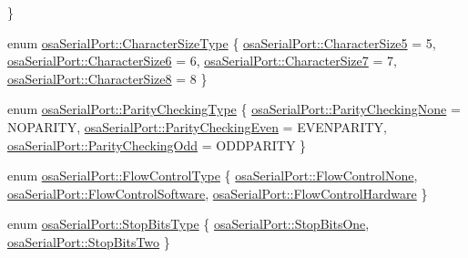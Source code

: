 \begin{DoxyCompactItemize}
 \}
\item 
enum \hyperlink{group__cisst_o_s_abstraction_ga9b6b558d8e4327ca921d9c010bec0462}{osa\+Serial\+Port\+::\+Character\+Size\+Type} \{ \hyperlink{group__cisst_o_s_abstraction_gga9b6b558d8e4327ca921d9c010bec0462a71a6f08cc8e95db9bb628a9e0f002376}{osa\+Serial\+Port\+::\+Character\+Size5} = 5, 
\hyperlink{group__cisst_o_s_abstraction_gga9b6b558d8e4327ca921d9c010bec0462a11e05646fa70b36bef65d1895974e4ca}{osa\+Serial\+Port\+::\+Character\+Size6} = 6, 
\hyperlink{group__cisst_o_s_abstraction_gga9b6b558d8e4327ca921d9c010bec0462a454d92a27af4c9f96b0c6c729e67b1ef}{osa\+Serial\+Port\+::\+Character\+Size7} = 7, 
\hyperlink{group__cisst_o_s_abstraction_gga9b6b558d8e4327ca921d9c010bec0462af6b6d68d0c71004693b62d55aed02837}{osa\+Serial\+Port\+::\+Character\+Size8} = 8
 \}
\item 
enum \hyperlink{group__cisst_o_s_abstraction_ga5a7547284e891eed488992c6a7204bfa}{osa\+Serial\+Port\+::\+Parity\+Checking\+Type} \{ \hyperlink{group__cisst_o_s_abstraction_gga5a7547284e891eed488992c6a7204bfaabbada773c8b505fc5733796acadee102}{osa\+Serial\+Port\+::\+Parity\+Checking\+None} = N\+O\+P\+A\+R\+I\+T\+Y, 
\hyperlink{group__cisst_o_s_abstraction_gga5a7547284e891eed488992c6a7204bfaa9abab4a570a32561ff68a7546f377bc2}{osa\+Serial\+Port\+::\+Parity\+Checking\+Even} = E\+V\+E\+N\+P\+A\+R\+I\+T\+Y, 
\hyperlink{group__cisst_o_s_abstraction_gga5a7547284e891eed488992c6a7204bfaa883d489757f267bca2a668245fc46a6d}{osa\+Serial\+Port\+::\+Parity\+Checking\+Odd} = O\+D\+D\+P\+A\+R\+I\+T\+Y
 \}
\item 
enum \hyperlink{group__cisst_o_s_abstraction_ga006138c4626520d3c2c1e5a78b279435}{osa\+Serial\+Port\+::\+Flow\+Control\+Type} \{ \hyperlink{group__cisst_o_s_abstraction_gga006138c4626520d3c2c1e5a78b279435a4196a7b3cbc15cf4f190ddc0e19a9254}{osa\+Serial\+Port\+::\+Flow\+Control\+None}, 
\hyperlink{group__cisst_o_s_abstraction_gga006138c4626520d3c2c1e5a78b279435a2ee117d5ab31cf26e91fc92c5af4e3f7}{osa\+Serial\+Port\+::\+Flow\+Control\+Software}, 
\hyperlink{group__cisst_o_s_abstraction_gga006138c4626520d3c2c1e5a78b279435a5c4075ee50d41c475a51232e382333f3}{osa\+Serial\+Port\+::\+Flow\+Control\+Hardware}
 \}
\item 
enum \hyperlink{group__cisst_o_s_abstraction_gaaa561ff95e10634b7ffa9ebf0ff164b5}{osa\+Serial\+Port\+::\+Stop\+Bits\+Type} \{ \hyperlink{group__cisst_o_s_abstraction_ggaaa561ff95e10634b7ffa9ebf0ff164b5adeec2c5e4e7d8f86bdc60559f0bdb353}{osa\+Serial\+Port\+::\+Stop\+Bits\+One}, 
\hyperlink{group__cisst_o_s_abstraction_ggaaa561ff95e10634b7ffa9ebf0ff164b5a06af1341102bbf2fc88fb73b10a3adb8}{osa\+Serial\+Port\+::\+Stop\+Bits\+Two}
 \}
\end{DoxyCompactItemize}
